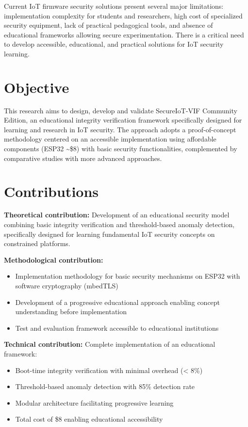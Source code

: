 Current IoT firmware security solutions present several major limitations: implementation complexity for students and researchers, high cost of specialized security equipment, lack of practical pedagogical tools, and absence of educational frameworks allowing secure experimentation. There is a critical need to develop accessible, educational, and practical solutions for IoT security learning.

\section*{Objective}

This research aims to design, develop and validate SecureIoT-VIF Community Edition, an educational integrity verification framework specifically designed for learning and research in IoT security. The approach adopts a proof-of-concept methodology centered on an accessible implementation using affordable components (ESP32 \textasciitilde \$8) with basic security functionalities, complemented by comparative studies with more advanced approaches.

\section*{Contributions}

\textbf{Theoretical contribution:} Development of an educational security model combining basic integrity verification and threshold-based anomaly detection, specifically designed for learning fundamental IoT security concepts on constrained platforms.

\textbf{Methodological contribution:}
\begin{itemize}
    \item Implementation methodology for basic security mechanisms on ESP32 with software cryptography (mbedTLS)
    \item Development of a progressive educational approach enabling concept understanding before implementation
    \item Test and evaluation framework accessible to educational institutions
\end{itemize}

\textbf{Technical contribution:} Complete implementation of an educational framework:
\begin{itemize}
    \item Boot-time integrity verification with minimal overhead (< 8\%)
    \item Threshold-based anomaly detection with 85\% detection rate
    \item Modular architecture facilitating progressive learning
    \item Total cost of \$8 enabling educational accessibility
\end{itemize}

